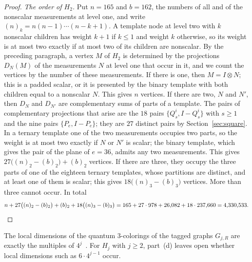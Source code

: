 \begin{proof}
\emph{The order of $H_2$.} Put $n=165$ and $b=162$, the numbers of all and of the nonscalar measurements at level one, and write $(n)_k=n(n-1)\cdots(n-k+1)$. A template node at level two with $k$ nonscalar children has weight $k+1$ if $k\le1$ and weight $k$ otherwise, so its weight is at most two exactly if at most two of its children are nonscalar. By the preceding paragraph, a vertex $M$ of $H_2$ is determined by the projections $D_N(M)$ of the measurements $N$ at level one that occur in it, and we count the vertices by the number of these measurements. If there is one, then $M=I\otimes N$; this is a padded scalar, or it is presented by the binary template with both children equal to a nonscalar $N$. This gives $n$ vertices. If there are two, $N$ and $N'$, then $D_N$ and $D_{N'}$ are complementary sums of parts of a template. The pairs of complementary projections that arise are the $18$ pairs $\{Q^i_s,I-Q^i_s\}$ with $s\ge1$ and the nine pairs $\{P_e,I-P_e\}$; they are $27$ distinct pairs by Section~\ref{sec:square}. In a ternary template one of the two measurements occupies two parts, so the weight is at most two exactly if $N$ or $N'$ is scalar; the binary template, which gives the pair of the plane of $e=36$, admits any two measurements. This gives $27\bigl((n)_2-(b)_2\bigr)+(b)_2$ vertices. If there are three, they occupy the three parts of one of the eighteen ternary templates, whose partitions are distinct, and at least one of them is scalar; this gives $18\bigl((n)_3-(b)_3\bigr)$ vertices. More than three cannot occur. In total
\[
 n+27\bigl((n)_2-(b)_2\bigr)+(b)_2+18\bigl((n)_3-(b)_3\bigr)=165+27\cdot978+26{,}082+18\cdot237{,}660=4{,}330{,}533 .\qedhere
\]
\end{proof}

The local dimensions of the quantum $3$-colorings of the tagged graphs $G_{j,R}$ are exactly the multiples of $4^j$~\cite[Theorem~4.1]{Z}. For $H_j$ with $j\ge2$, part~(d) leaves open whether local dimensions such as $6\cdot4^{j-1}$ occur.
